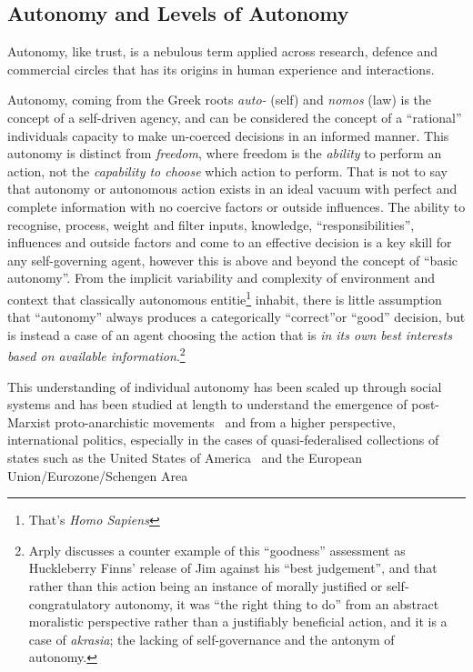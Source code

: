 \subsection{Autonomy and Levels of Autonomy}

Autonomy, like trust, is a nebulous term applied across research, defence and commercial circles that has its origins in human experience and interactions. 

Autonomy, coming from the Greek roots \textit{auto-} (self) and \textit{nomos} (law) is the concept of a self-driven agency, and can be considered the concept of a ``rational'' individuals capacity to make un-coerced decisions in an informed manner. 
This autonomy is distinct from \textit{freedom}, where freedom is the \textit{ability} to perform an action, not the \textit{capability to choose} which action to perform.
That is not to say that autonomy or autonomous action exists in an ideal vacuum with perfect and complete information with no coercive factors or outside influences.
The ability to recognise, process, weight and filter inputs, knowledge, ``responsibilities'', influences and outside factors and come to an effective decision is a key skill for any self-governing agent, however this is above and beyond the concept of ``basic autonomy''.
From the implicit variability and complexity of environment and context that classically autonomous entitie\footnote{That's \textit{Homo Sapiens}} inhabit, there is little assumption that ``autonomy'' always produces a categorically ``correct''or ``good'' decision, but is instead a case of an agent choosing the action that is \textit{in its own best interests based on available information}\cite{Arpaly2003}.\footnote{Arply discusses a counter example of this ``goodness'' assessment as  Huckleberry Finns' release of Jim against his ``best judgement'', and that rather than this action being an instance of morally justified or self-congratulatory autonomy, it was ``the right thing to do'' from an abstract moralistic perspective rather than a justifiably beneficial action, and it is a case of \textit{akrasia}; the lacking of self-governance and the antonym of autonomy.}

This understanding of individual autonomy has been scaled up through social systems and has been studied at length to understand the emergence of post-Marxist proto-anarchistic movements~\cite{Hunter2016} and from a higher perspective, international politics, especially in the cases of quasi-federalised collections of states such as the United States of America~\cite{Halberstam2001} and the European Union/Eurozone/Schengen Area~\cite{Richter2012}


